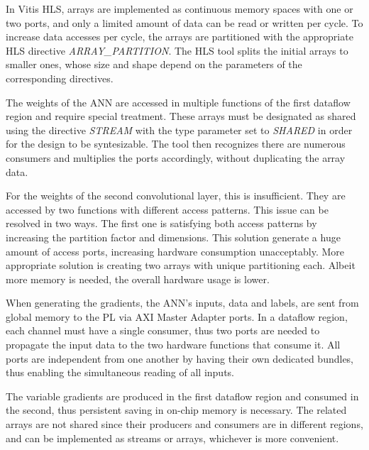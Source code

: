 In Vitis HLS, arrays are implemented as continuous memory spaces with one or two ports, and only a limited amount of data can be read or written per cycle. To increase data accesses per cycle, the arrays are partitioned with the appropriate HLS directive \emph{ARRAY\_PARTITION}. The HLS tool splits the initial arrays to smaller ones, whose size and shape depend on the parameters of the corresponding directives. %

The weights of the ANN are accessed in multiple functions of the first dataflow region and require special treatment. These arrays must be designated as shared using the directive \emph{STREAM} with the type parameter set to \emph{SHARED} in order for the design to be syntesizable. The tool then recognizes there are numerous consumers and multiplies the ports accordingly, without duplicating the array data. %

For the weights of the second convolutional layer, this is insufficient. They are accessed by two functions with different access patterns. This issue can be resolved in two ways. The first one is satisfying both access patterns by increasing the partition factor and dimensions. This solution generate a huge amount of access ports, increasing hardware consumption unacceptably. More appropriate solution is creating two arrays with unique partitioning each. Albeit more memory is needed, the overall hardware usage is lower. %

When generating the gradients, the ANN's inputs, data and labels, are sent from global memory to the PL via AXI Master Adapter ports. In a dataflow region, each channel must have a single consumer, thus two ports are needed to propagate the input data to the two hardware functions that consume it. All ports are independent from one another by having their own dedicated bundles, thus enabling the simultaneous reading of all inputs. %

The variable gradients are produced in the first dataflow region and consumed in the second, thus persistent saving in on-chip memory is necessary. The related arrays are not shared since their producers and consumers are in different regions, and can be implemented as streams or arrays, whichever is more convenient. %


